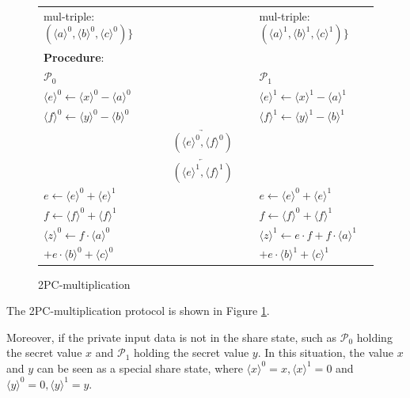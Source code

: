 \documentclass[letterpaper]{article} %
\begin{document}
\begin{figure}[ht]
{\begin{tabular}{lcl}
            mul-triple:$
            (\langle a\rangle ^{0},\langle b\rangle ^{0},\langle c\rangle ^{0})\}$
            &
            &
            mul-triple:$ (\langle a\rangle ^{1},\langle b\rangle ^{1},\langle c\rangle ^{1})\}$
            \\
            \textbf{Procedure}:\\
            $\mathcal{P}_{0}$ &  &  $\mathcal{P}_{1}$ \\
            $\langle e\rangle ^{0}\leftarrow\langle x\rangle ^{0}-\langle a\rangle ^{0}$
            &
            &
            $\langle e\rangle ^{1}\leftarrow\langle x\rangle ^{1}-\langle a\rangle ^{1}$
            \\
            $\langle f\rangle ^{0}\leftarrow\langle y\rangle ^{0}-\langle b\rangle ^{0}$
            &
            &
            $\langle f\rangle ^{1}\leftarrow\langle y\rangle ^{1}-\langle b\rangle ^{1}$
            \\
            & $\underrightarrow{~~~~~~(\langle e\rangle ^{0},\langle f\rangle ^{0})~~~~~~}$ &\\
            & $\underleftarrow{~~~~~~(\langle e\rangle ^{1},\langle f\rangle ^{1})~~~~~~}$ &\\
            $e\leftarrow\langle e\rangle ^{0}+\langle e\rangle ^{1}$& &$e\leftarrow\langle e\rangle ^{0}+\langle e\rangle ^{1}$\\
            $f\leftarrow\langle f\rangle ^{0}+\langle f\rangle ^{1}$& &$f\leftarrow\langle f\rangle ^{0}+\langle f\rangle ^{1}$\\
            $\langle z\rangle^{0}\leftarrow f\cdot \langle a\rangle^{0}$
            & &
            $\langle z\rangle^{1}\leftarrow e \cdot f + f\cdot \langle a\rangle^{1}$\\
            $+e \cdot \langle b\rangle^{0} + \langle c\rangle^{0}$& &$+e \cdot \langle b\rangle^{1} + \langle c\rangle^{1}$\\
            \hline

        \end{tabular}}
        \caption{2PC-multiplication}
        \label{2PC-multiplication}


    \end{figure}
    The 2PC-multiplication protocol is shown in Figure \ref{2PC-multiplication}.

    Moreover, if the private input data is not in the share state,
    such as $\mathcal{P}_{0}$ holding the secret value $x$
    and $\mathcal{P}_{1}$ holding the secret value $y$.
    In this situation, the value $x$ and $y$ can be
    seen as a special share state, where
    $\langle x\rangle ^{0}=x,\langle x\rangle ^{1}=0$ and
    $\langle y\rangle ^{0}=0,\langle y\rangle ^{1}=y$.
\end{document}

